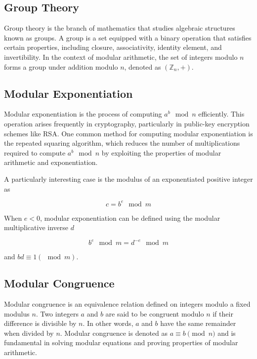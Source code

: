 \documentclass{article}
\renewcommand{\_}{\ifincsname_\else\legacyunderscore\fi}
\begin{document}
        \subsection{Group Theory}

Group theory is the branch of mathematics that studies algebraic structures known as groups. A group is a set equipped with a binary operation that satisfies certain properties, including closure, associativity, identity element, and invertibility. In the context of modular arithmetic, the set of integers modulo \(n\) forms a group under addition modulo \(n\), denoted as \((\mathbb{Z}_n, +)\).

        \subsection{Modular Exponentiation}
Modular exponentiation is the process of computing \(a^b \mod{n}\) efficiently. This operation arises frequently in cryptography, particularly in public-key encryption schemes like RSA. One common method for computing modular exponentiation is the repeated squaring algorithm, which reduces the number of multiplications required to compute \(a^b \mod{n}\) by exploiting the properties of modular arithmetic and exponentiation.

        A particularly interesting case is the modulus of an exponentiated positive integer as

        \begin{equation}
            c = b^e \mod m
        \end{equation}

        When $e < 0$, modular exponentiation can be defined using the modular multiplicative inverse $d$

        \begin{equation}
            b^e \mod m = d^{-e} \mod m
        \end{equation}

        and $b d \equiv 1 (\mod m)$.

    \subsection{Modular Congruence}    
    Modular congruence is an equivalence relation defined on integers modulo a fixed modulus \(n\). Two integers \(a\) and \(b\) are said to be congruent modulo \(n\) if their difference is divisible by \(n\). In other words, \(a\) and \(b\) have the same remainder when divided by \(n\). Modular congruence is denoted as \(a \equiv b \pmod{n}\) and is fundamental in solving modular equations and proving properties of modular arithmetic.
\end{document}
